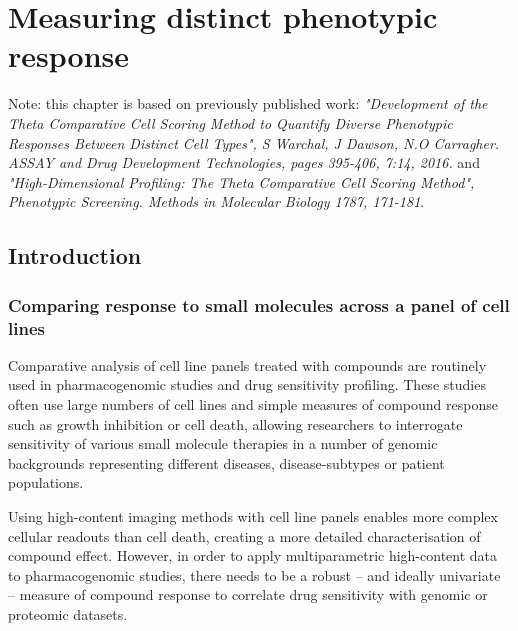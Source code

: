 \documentclass[a4paper,11pt,twoside,openright]{scrbook}
\begin{document}



\chapter{Measuring distinct phenotypic response} \label{chapter:tccs}

\scriptsize{Note: this chapter is based on previously published work: \textit{"Development of the Theta Comparative Cell Scoring Method to Quantify Diverse Phenotypic Responses Between Distinct Cell Types", S Warchal, J Dawson, N.O Carragher. ASSAY and Drug Development Technologies, pages 395-406, 7:14, 2016.} and \textit{"High-Dimensional Profiling: The Theta Comparative Cell Scoring Method", Phenotypic Screening. Methods in Molecular Biology 1787, 171-181}.} 



\section{Introduction}
\normalsize
\subsection{Comparing response to small molecules across a panel of cell lines}
Comparative analysis of cell line panels treated with compounds are routinely used in pharmacogenomic studies and drug sensitivity profiling.
These studies often use large numbers of cell lines and simple measures of compound response such as growth inhibition or cell death, allowing researchers to interrogate sensitivity of various small molecule therapies in a number of genomic backgrounds representing different diseases, disease-subtypes or patient populations.

Using high-content imaging methods with cell line panels enables more complex cellular readouts than cell death, creating a more detailed characterisation of compound effect.
However, in order to apply multiparametric high-content data to pharmacogenomic studies, there needs to be a robust -- and ideally univariate -- measure of compound response to correlate drug sensitivity with genomic or proteomic datasets.
\end{document}
